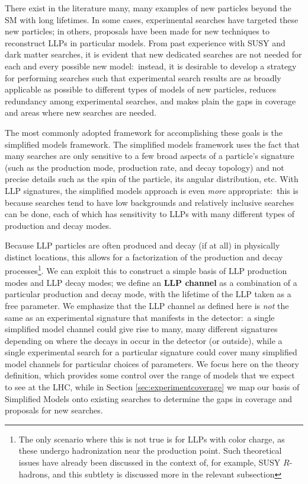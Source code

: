 There exist in the literature many, many examples of new particles beyond the SM with long lifetimes. In some cases, experimental searches have targeted these new particles; in others, proposals have been made for new techniques to reconstruct LLPs in particular models. From past experience with SUSY and dark matter searches, it is evident that new dedicated searches are not needed for each and every possible new model:~instead, it is desirable to develop a strategy for performing searches such that experimental search results are as broadly applicable as possible to different types of models of new particles, reduces redundancy among experimental searches, and makes plain the gaps in coverage and areas where new searches are needed. 

The most commonly adopted framework for accomplishing these goals is the simplified models framework. The simplified models framework uses the fact that many searches are only sensitive to a few broad aspects of a particle's signature (such as the production mode, production rate, and decay topology) and not precise details such as the spin of the particle, its angular distribution, etc. With LLP signatures, the simplified models approach is even \emph{more} appropriate:~this is because searches tend to have low backgrounds and relatively inclusive searches can be done, each of which has sensitivity to LLPs with many different types of production and decay modes.

Because LLP particles are often produced and decay (if at all) in physically distinct locations, this allows for a factorization of the production and decay processes\footnote{The only scenario where this is not true is for LLPs with color charge, as these undergo hadronization near the production point. Such theoretical issues have already been discussed in the context of, for example, SUSY $R$-hadrons, and this subtlety is discussed more in the relevant subsection}. We can exploit this to construct a simple basis of LLP production modes and LLP decay modes; we define an {\bf LLP channel} as a combination of a particular production and decay mode, with the lifetime of the LLP taken as a free parameter. We emphasize that the LLP channel as defined here is \emph{not} the same as an experimental signature that manifests in the detector:~a single simplified model channel could give rise to many, many different signatures depending on where the decays in occur in the detector (or outside), while a single experimental search for a particular signature could cover many simplified model channels for particular choices of parameters. We focus here on the theory definition, which provides some control over the range of models that we expect to see at the LHC, while in Section \ref{sec:experimentcoverage} we map our basis of Simplified Models onto existing searches to determine the gaps in coverage and proposals for new searches.

